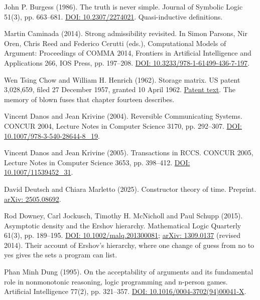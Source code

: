 \documentclass[11pt,twoside]{article}
\theoremstyle{thielethm}
\theoremstyle{thieledef}
\theoremstyle{thieledef}
\theoremstyle{thieledef}
\theoremstyle{thielethm}
\theoremstyle{thieleobs}
\theoremstyle{thielethm}
\begin{document}
\noindent John P. Burgess (1986). The truth is never simple. Journal of Symbolic Logic 51(3), pp. 663--681. \href{https://doi.org/10.2307/2274021}{DOI: 10.2307/2274021}. Quasi-inductive definitions.
\par\medskip

\noindent Martin Caminada (2014). Strong admissibility revisited. In Simon Parsons, Nir Oren, Chris Reed and Federico Cerutti (eds.), Computational Models of Argument: Proceedings of COMMA 2014, Frontiers in Artificial Intelligence and Applications 266, IOS Press, pp. 197--208. \href{https://doi.org/10.3233/978-1-61499-436-7-197}{DOI: 10.3233/978-1-61499-436-7-197}.
\par\medskip

\noindent Wen Tsing Chow and William H. Henrich (1962). Storage matrix. US patent 3,028,659, filed 27 December 1957, granted 10 April 1962. \href{https://patents.google.com/patent/US3028659A/en}{Patent text}. The memory of blown fuses that chapter fourteen describes.
\par\medskip

\noindent Vincent Danos and Jean Krivine (2004). Reversible Communicating Systems. CONCUR 2004, Lecture Notes in Computer Science 3170, pp. 292--307. \href{https://doi.org/10.1007/978-3-540-28644-8_19}{DOI: 10.1007/978-3-540-28644-8\_19}.
\par\medskip

\noindent Vincent Danos and Jean Krivine (2005). Transactions in RCCS. CONCUR 2005, Lecture Notes in Computer Science 3653, pp. 398--412. \href{https://doi.org/10.1007/11539452_31}{DOI: 10.1007/11539452\_31}.
\par\medskip

\noindent David Deutsch and Chiara Marletto (2025). Constructor theory of time. Preprint. \href{https://arxiv.org/abs/2505.08692}{arXiv: 2505.08692}.
\par\medskip

\noindent Rod Downey, Carl Jockusch, Timothy H. McNicholl and Paul Schupp (2015). Asymptotic density and the Ershov hierarchy. Mathematical Logic Quarterly 61(3), pp. 189--195. \href{https://doi.org/10.1002/malq.201300081}{DOI: 10.1002/malq.201300081}; \href{https://arxiv.org/abs/1309.0137}{arXiv: 1309.0137} (revised 2014). Their account of Ershov's hierarchy, where one change of guess from no to yes gives the sets a program can list.
\par\medskip

\noindent Phan Minh Dung (1995). On the acceptability of arguments and its fundamental role in nonmonotonic reasoning, logic programming and n-person games. Artificial Intelligence 77(2), pp. 321--357. \href{https://doi.org/10.1016/0004-3702(94)00041-X}{DOI: 10.1016/0004-3702(94)00041-X}.
\par\medskip
\end{document}
